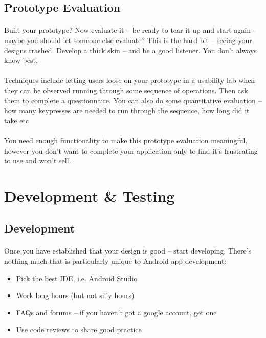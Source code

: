 \documentclass[12pt, a4paper, twoside]{book}
\begin{document}
\subsection{Prototype Evaluation}
\paragraph{} Built your prototype? Now evaluate it – be ready to tear it up and start again – maybe you should let someone else evaluate? This is the hard bit – seeing your designs trashed. Develop a thick skin – and be a good listener. You don't always know best.

\paragraph{} Techniques include letting users loose on your prototype in a usability lab when they can be observed running through some sequence of operations. Then ask them to complete a questionnaire. You can also do some quantitative evaluation – how many keypresses are needed to run through the sequence, how long did it take etc

\paragraph{} You need enough functionality to make this prototype evaluation meaningful, however you don't want to complete your application only to find it's frustrating to use and won't sell.

\section{Development \& Testing}

\subsection{Development}
\paragraph{} Once you have established that your design is good – start developing. There’s nothing much that is particularly unique to Android app development:

\begin{itemize}
\item Pick the best IDE, i.e. Android Studio
\item Work long hours (but not silly hours)
\item FAQs and forums – if you haven’t got a google account, get one
\item Use code reviews to share good practice
\end{itemize}
\end{document}
